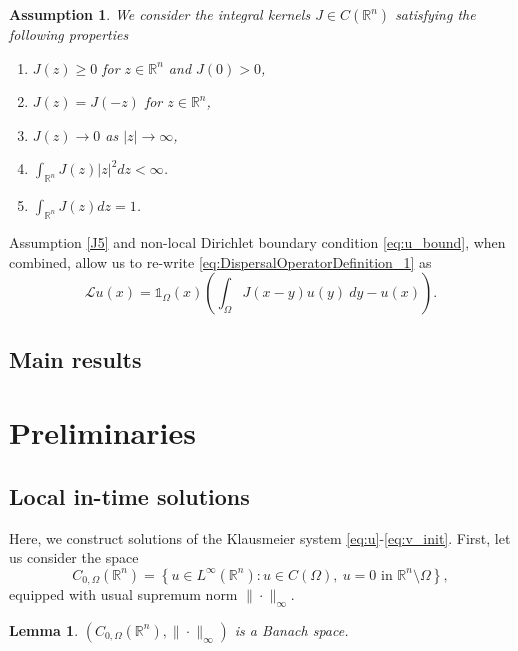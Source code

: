 \documentclass[12pt, a4paper]{article}
\makeatletter
\theoremstyle{break}
\theoremstyle{break}
\theoremstyle{break}
\newtheorem{asm}{Assumption}[section]
\theoremstyle{break}
\theoremstyle{break}
\newtheorem{lem}{Lemma}[section]
\theoremstyle{break}
\theoremstyle{break}
\newcommand{\mylabel}[2]{#2\def\@currentlabel{#2}\label{#1}}
\makeatother
\begin{document}
\begin{asm}
    \label{assumptions_general_kernel}
    We consider the integral kernels $J \in C(\mathbb{R}^n)$ satisfying the following properties
    \begin{enumerate}[label=\textnormal{(\arabic*)}]
        \item [\mylabel{J1}{(J1)}] $J(z) \geq 0$ for $z \in \mathbb{R}^n$ and $J(0) > 0$, 
        \item [\mylabel{J2}{(J2)}] $J(z) = J(-z)$ for $z \in \mathbb{R}^n$,
        \item [\mylabel{J3}{(J3)}] $J(z) \rightarrow 0$ as $|z| \rightarrow \infty$,
        \item [\mylabel{J4}{(J4)}] $\int_{\mathbb{R}^n} J(z)|z|^2dz < \infty$.
        \item [\mylabel{J5}{(J5)}] $\int_{\mathbb{R}^n} J(z) dz = 1$.
    \end{enumerate}
\end{asm}
Assumption \ref{J5} and non-local Dirichlet boundary condition \eqref{eq:u_bound}, when combined, allow us to re-write \eqref{eq:DispersalOperatorDefinition_1} as
\begin{equation}
    \label{EQ:DispersalOperatorDefinition_2}
    \mathcal{L}u(x) = \mathds{1}_{\Omega}(x) \left(\int_{\Omega} J(x-y) u(y)\:dy - u(x)\right).
\end{equation}

\subsection{Main results}

\section{Preliminaries}
\subsection{Local in-time solutions} 
Here, we construct solutions of the Klausmeier system \eqref{eq:u}-\eqref{eq:v_init}. First, let us consider the space
\begin{equation}
    \label{EQ:C_0_OMEGA}
    C_{0, \Omega}(\mathbb{R}^n) = \left\{ u \in L^\infty(\mathbb{R}^n): u \in C(\Omega), \: u = 0 \text{ in } \mathbb{R}^n \setminus \Omega \right\},
\end{equation}
equipped with usual supremum norm $\|\cdot\|_\infty$.
\begin{lem}
    \label{lem:C_0_OMEGA_BANACH_SPACE}
    $\left(C_{0, \Omega}(\mathbb{R}^n), \|\cdot\|_\infty\right)$ is a Banach space.
\end{lem}
\end{document}
